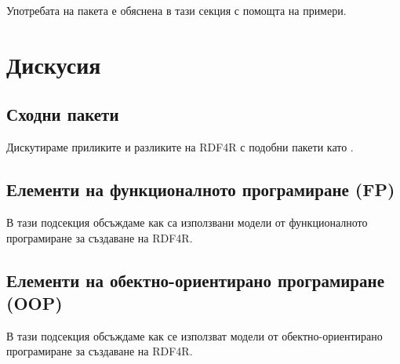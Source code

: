 Употребата на пакета е обяснена в тази секция с помощта на примери.

\section{Дискусия}

\subsection{Сходни пакети}

Дискутираме приликите и разликите на RDF4R с подобни пакети като .

\subsection{Елементи на функционалното програмиране (FP)}

В тази подсекция обсъждаме как са използвани модели от функционалното програмиране за създаване на RDF4R.

\subsection{Елементи на обектно-ориентирано програмиране (OOP)}

В тази подсекция обсъждаме как се използват модели от обектно-ориентирано програмиране за създаване на RDF4R.
